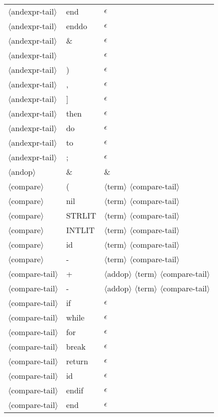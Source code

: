 \documentclass[11pt, fleqn]{article}
\newcommand{\atag}[1]{$\langle$#1$\rangle$}
\begin{document}
\begin{longtable}{l|l|l}
\atag{andexpr-tail}				&	end			&	$\epsilon$	\\
\atag{andexpr-tail}				&	enddo		&	$\epsilon$	\\
\atag{andexpr-tail}				&	\&			&	$\epsilon$	\\
\atag{andexpr-tail}				&	\textbar		&	$\epsilon$	\\
\atag{andexpr-tail}				&	)			&	$\epsilon$	\\
\atag{andexpr-tail}				&	,			&	$\epsilon$	\\
\atag{andexpr-tail}				&	]			&	$\epsilon$	\\
\atag{andexpr-tail}				&	then			&	$\epsilon$	\\
\atag{andexpr-tail}				&	do			&	$\epsilon$	\\
\atag{andexpr-tail}				&	to			&	$\epsilon$	\\
\atag{andexpr-tail}				&	;			&	$\epsilon$	\\
\atag{andop}						&	\&			&	\&										\\
\atag{compare} 					&	(			&	\atag{term} \atag{compare-tail}	\\
\atag{compare} 					&	nil			&	\atag{term} \atag{compare-tail}	\\
\atag{compare} 					&	STRLIT		&	\atag{term} \atag{compare-tail}	\\
\atag{compare} 					&	INTLIT		&	\atag{term} \atag{compare-tail}	\\
\atag{compare} 					&	id			&	\atag{term} \atag{compare-tail}	\\
\atag{compare} 					&	-			&	\atag{term} \atag{compare-tail}	\\
\atag{compare-tail}				&	+			&	\atag{addop} \atag{term} \atag{compare-tail}	\\
\atag{compare-tail}				&	-			&	\atag{addop} \atag{term} \atag{compare-tail}	\\
\atag{compare-tail}				&	if			&	$\epsilon$					\\
\atag{compare-tail}				&	while			&	$\epsilon$					\\
\atag{compare-tail}				&	for			&	$\epsilon$					\\
\atag{compare-tail}				&	break			&	$\epsilon$					\\
\atag{compare-tail}				&	return			&	$\epsilon$					\\
\atag{compare-tail}				&	id			&	$\epsilon$					\\
\atag{compare-tail}				&	endif			&	$\epsilon$					\\
\atag{compare-tail}				&	end			&	$\epsilon$					\\

\end{longtable}
\end{document}
